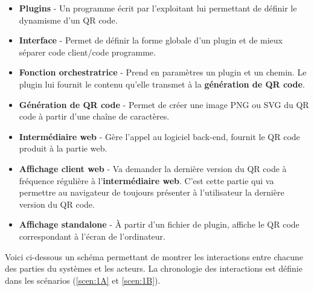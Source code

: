 \documentclass[a4paper,12pt]{article}
\begin{document}
\begin{itemize}
  \item \textbf{Plugins} - Un programme écrit par l'exploitant lui permettant de définir le dynamisme d'un QR code.\\
  
  \item \textbf{Interface} - Permet de définir la forme globale d'un plugin et de mieux séparer code client/code programme.\\
  
  \item \textbf{Fonction orchestratrice} - Prend en paramètres un plugin et un chemin. Le plugin lui fournit le contenu qu'elle transmet à la \textbf{génération de QR code}.\\
  
  \item \textbf{Génération de QR code} - Permet de créer une image PNG ou SVG du QR code à partir d'une chaîne de caractères.\\
  
  \item \textbf{Intermédiaire web} - Gère l'appel au logiciel back-end, fournit le QR code produit à la partie web.\\
  
  \item \textbf{Affichage client web} - Va demander la dernière version du QR code à fréquence régulière à l'\textbf{intermédiaire web}. C'est cette partie qui va permettre au navigateur de toujours présenter à l'utilisateur la dernière version du QR code.\\
  
  \item \textbf{Affichage standalone} - À partir d'un fichier de plugin, affiche le QR code correspondant à l'écran de l'ordinateur.\\

\end{itemize}

Voici ci-dessous un schéma permettant de montrer les interactions entre chacune des parties du systèmes et les acteurs. La chronologie des interactions est définie dans les scénarios (\ref{scen:1A} et \ref{scen:1B}).
\end{document}
